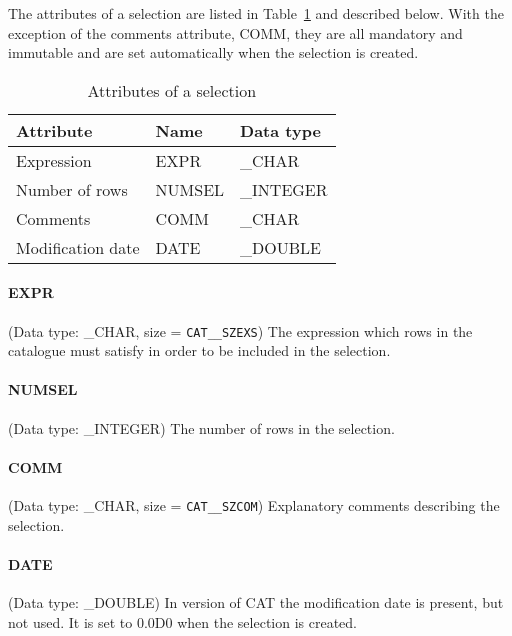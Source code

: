 The attributes of a selection are listed in Table~\ref{SELECT_ATT}
and described below. With the exception of the comments attribute,
COMM, they are all mandatory and immutable and are set automatically
when the selection is created.

\begin{table}[htbp]

\begin{center}
\begin{tabular}{lll}
Attribute         & Name    & Data type  \\ \hline
Expression        & EXPR    & \_CHAR     \\
Number of rows    & NUMSEL  & \_INTEGER  \\
Comments          & COMM    & \_CHAR     \\
Modification date & DATE    & \_DOUBLE   \\
\end{tabular}
\end{center}

\caption{\label{SELECT_ATT}Attributes of a selection}

\end{table}

\paragraph{EXPR}
(Data type: \_CHAR, size = {\tt CAT\_\_SZEXS})
The expression which rows in the catalogue must satisfy in order to be
included in the selection.

\paragraph{NUMSEL}
(Data type: \_INTEGER)
The number of rows in the selection.

\paragraph{COMM}
(Data type: \_CHAR, size = {\tt CAT\_\_SZCOM})
Explanatory comments describing the selection.

\paragraph{DATE}
(Data type: \_DOUBLE)
In version \CATversion of CAT the modification date is present, but
not used. It is set to 0.0D0 when the selection is created.


